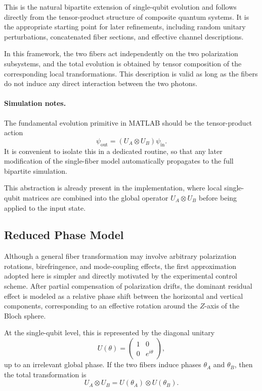 \documentclass[a4paper]{article}
\begin{document}
This is the natural bipartite extension of single-qubit evolution and follows directly from the tensor-product structure of composite quantum systems. It is the appropriate starting point for later refinements, including random unitary perturbations, concatenated fiber sections, and effective channel descriptions.

In this framework, the two fibers act independently on the two polarization subsystems, and the total evolution is obtained by tensor composition of the corresponding local transformations. This description is valid as long as the fibers do not induce any direct interaction between the two photons.

\paragraph{Simulation notes.}
The fundamental evolution primitive in MATLAB should be the tensor-product action
\[
\psi_{\mathrm{out}} = (U_A \otimes U_B)\psi_{\mathrm{in}}.
\]
It is convenient to isolate this in a dedicated routine, so that any later modification of the single-fiber model automatically propagates to the full bipartite simulation.

This abstraction is already present in the implementation, where local single-qubit matrices are combined into the global operator \(U_A \otimes U_B\) before being applied to the input state.


\subsection{Reduced Phase Model}

Although a general fiber transformation may involve arbitrary polarization rotations, birefringence, and mode-coupling effects, the first approximation adopted here is simpler and directly motivated by the experimental control scheme. After partial compensation of polarization drifts, the dominant residual effect is modeled as a relative phase shift between the horizontal and vertical components, corresponding to an effective rotation around the \(Z\)-axis of the Bloch sphere.

At the single-qubit level, this is represented by the diagonal unitary
\[
U(\theta)
=
\begin{pmatrix}
1 & 0\\
0 & e^{i\theta}
\end{pmatrix},
\]
up to an irrelevant global phase. If the two fibers induce phases \(\theta_A\) and \(\theta_B\), then the total transformation is
\[
U_A \otimes U_B
=
U(\theta_A)\otimes U(\theta_B).
\]
\end{document}
